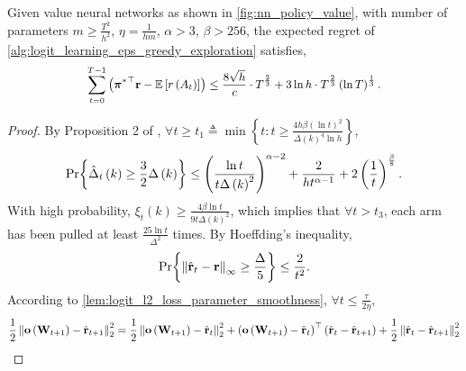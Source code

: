 \begin{thm}
\label{thm:logit_learning_main_result}
    Given value neural networks as shown in \cref{fig:nn_policy_value}, with number of parameters $m \ge \frac{T^2}{h^2}$, $\eta = \frac{1}{h m}$, $\alpha > 3$, $\beta > 256$, the expected regret of \cref{alg:logit_learning_eps_greedy_exploration} satisfies,
\begin{equation*}
\small
\begin{split}
    \sum\limits_{t=0}^{T-1}{ \left( {\rvpi^*}^\top \rvr - \sE \left[ r\left(A_t\right) \right] \right)}  \le \frac{8 \sqrt{h}}{c} \cdot T^{\frac{2}{3}} + 3 \ln{h} \cdot T^{\frac{2}{3}} \left(\ln{T}\right)^{\frac{1}{3}}.
\end{split}
\end{equation*}
\end{thm}
\begin{proof}
    By Proposition 2 of \citep{seldin2017improved},
    $\forall t \ge t_1 \triangleq \min{\left\{ t : t \ge \frac{4 h \beta \left(\ln{t}\right)^2}{\Delta\left(k\right)^4 \ln{h}} \right\}}$,
\begin{equation*}
\begin{split}
    {\text{Pr}}{\left\{ \hat{\Delta}_t\left(k\right) \ge \frac{3}{2} \Delta\left(k\right) \right\}} \le \left( \frac{\ln{t}}{t \Delta\left(k\right)^2} \right)^{\alpha - 2} + \frac{2}{h t^{\alpha - 1}} + 2 \left(\frac{1}{t}\right)^{\frac{\beta}{8}}.
\end{split}
\end{equation*}
With high probability, $\xi_t\left(k\right) \ge \frac{4 \beta \ln{t}}{9 t \Delta\left(k\right)^2}$, which implies that $\forall t > t_3$,  each arm has been pulled at least $\frac{25\ln{t}}{\Delta^2}$ times. By Hoeffding's inequality,
\begin{equation*}
\begin{split}
    {\text{Pr}}{\left\{ \left\| \hat{{\mathbf{r}}}_t - {\mathbf{r}}\right\|_\infty \ge \frac{\Delta}{5} \right\}} \le \frac{2}{t^2}.
\end{split}
\end{equation*}
According to \cref{lem:logit_l2_loss_parameter_smoothness}, $\forall t \le \frac{\tau}{2 \eta}$,
\begin{equation*}
\begin{split}
    \frac{1}{2} \left\| \rvo\left( \rmW_{t+1} \right) - \hat{\rvr}_{t+1}\right\|_2^2 &= \frac{1}{2} \left\| \rvo\left( \rmW_{t+1} \right) - \hat{\rvr}_t\right\|_2^2 + \left( \rvo\left( \rmW_{t+1} \right) - \hat{\rvr}_t \right)^\top \left( \hat{\rvr}_t - \hat{\rvr}_{t+1} \right) + \frac{1}{2} \left\| \hat{\rvr}_t - \hat{\rvr}_{t+1} \right\|_2^2 \\

\end{split}
\end{equation*}
\end{proof}
